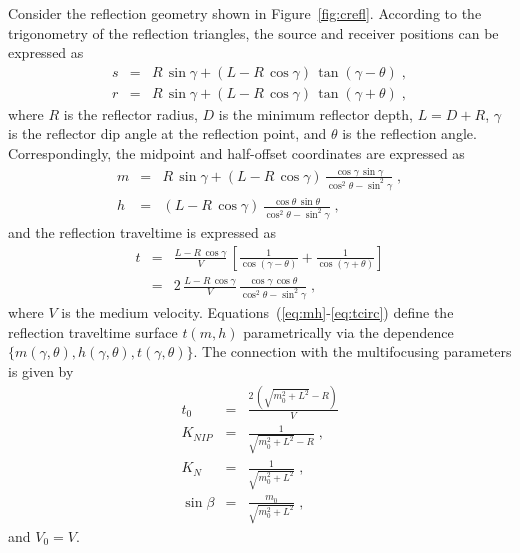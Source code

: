 
Consider the reflection geometry shown in
Figure~\ref{fig:crefl}. According to the trigonometry of the
reflection triangles, the source and receiver positions can be
expressed as
\begin{eqnarray}
\label{eq:xs}
s & = & R\,\sin{\gamma} + (L - R\,\cos{\gamma})\,\tan{(\gamma-\theta)}\;, \\
\label{eq:xr}
r & = & R\,\sin{\gamma} + (L - R\,\cos{\gamma})\,\tan{(\gamma+\theta)}\;,
\end{eqnarray}
where $R$ is the reflector radius, $D$ is the minimum reflector depth, $L=D+R$,
$\gamma$ is the reflector dip angle at the reflection point, and
$\theta$ is the reflection angle. Correspondingly, the midpoint and
half-offset coordinates are expressed as
\begin{eqnarray}
\nonumber
m & = & R\,\sin{\gamma} + (L - R\,\cos{\gamma})\,\frac{\cos{\gamma}\,\sin{\gamma}}{\cos^2{\theta} - \sin^2{\gamma}}\;, \\
\label{eq:mh}
h & = & (L - R\,\cos{\gamma})\,\frac{\cos{\theta}\,\sin{\theta}}{\cos^2{\theta} - \sin^2{\gamma}}\;,
\end{eqnarray}
and the reflection traveltime is expressed as
\begin{eqnarray}
\nonumber
t & = & \frac{L - R\,\cos{\gamma}}{V}\,\left[\frac{1}{\cos{(\gamma-\theta)}} + \frac{1}{\cos{(\gamma+\theta)}}\right] \\
& = & 2\,\frac{L - R\,\cos{\gamma}}{V}\,\frac{\cos{\gamma}\,\cos{\theta}}{\cos^2{\theta} - \sin^2{\gamma}}\;,
\label{eq:tcirc}
\end{eqnarray}
where $V$ is the medium
velocity. Equations~(\ref{eq:mh}-\ref{eq:tcirc}) define the reflection
traveltime surface $t(m,h)$ parametrically via the dependence
$\{m(\gamma,\theta),h(\gamma,\theta),t(\gamma,\theta)\}$. The
connection with the multifocusing parameters is given by
\begin{eqnarray}
\label{eq:ct0} 
t_0 & = & \frac{2\,\left(\sqrt{m_0^2 + L^2}-R\right)}{V} \\
\label{eq:cknip}
K_{NIP} & = & \frac{1}{\sqrt{m_0^2 + L^2}-R}\;,   \\
\label{eq:ckn}
K_N & = & \frac{1}{\sqrt{m_0^2 + L^2}}\;,   \\
\label{eq:cbeta}
\sin{\beta} & = & \frac{m_0}{\sqrt{m_0^2 + L^2}}\;,
\end{eqnarray}
and $V_0=V$.



